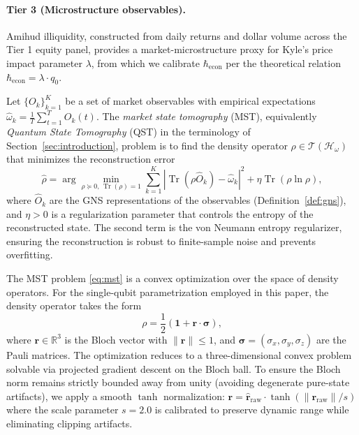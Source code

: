 \paragraph{Tier 3 (Microstructure observables).}
Amihud illiquidity, constructed from daily returns and dollar volume across the
Tier 1 equity panel, provides a market-microstructure proxy for Kyle's price impact
parameter $\lambda$, from which we calibrate $\hbar_{\mathrm{econ}}$ per the
theoretical relation $\hbar_{\mathrm{econ}} = \lambda \cdot q_0$.

\begin{definition}\label{def:mst}
Let $\{O_k\}_{k=1}^K$ be a set of market observables with empirical expectations
$\hat{\omega}_k = \frac{1}{T} \sum_{t=1}^T O_k(t)$. The \emph{market state
tomography} (MST), equivalently \emph{Quantum State Tomography} (QST) in the
terminology of Section~\ref{sec:introduction}, problem is to find the density operator
$\rho \in \mathcal{T}(\mathcal{H}_\omega)$ that minimizes the reconstruction error
\begin{equation}\label{eq:mst}
    \hat{\rho} = \arg\min_{\rho \succeq 0, \, \operatorname{Tr}(\rho) = 1}
    \sum_{k=1}^K \left| \operatorname{Tr}(\rho \hat{O}_k) - \hat{\omega}_k \right|^2
    + \eta \operatorname{Tr}(\rho \ln \rho),
\end{equation}
where $\hat{O}_k$ are the GNS representations of the observables
(Definition~\ref{def:gns}), and $\eta > 0$ is a regularization parameter that
controls the entropy of the reconstructed state. The second term is the von Neumann
entropy regularizer, ensuring the reconstruction is robust to finite-sample noise
and prevents overfitting.
\end{definition}

The MST problem \eqref{eq:mst} is a convex optimization over the space of density
operators. For the single-qubit parametrization employed in this paper, the density
operator takes the form
\begin{equation*}
    \rho = \frac{1}{2} \left( \mathbf{1} + \mathbf{r} \cdot \boldsymbol{\sigma} \right),
\end{equation*}
where $\mathbf{r} \in \mathbb{R}^3$ is the Bloch vector with $\|\mathbf{r}\| \leq 1$,
and $\boldsymbol{\sigma} = (\sigma_x, \sigma_y, \sigma_z)$ are the Pauli matrices.
The optimization reduces to a three-dimensional convex problem solvable via
projected gradient descent on the Bloch ball. To ensure the Bloch norm remains
strictly bounded away from unity (avoiding degenerate pure-state artifacts), we
apply a smooth $\tanh$ normalization: $\mathbf{r} = \hat{\mathbf{r}}_{\mathrm{raw}}
\cdot \tanh(\|\mathbf{r}_{\mathrm{raw}}\|/s)$ where the scale parameter $s = 2.0$
is calibrated to preserve dynamic range while eliminating clipping artifacts.

